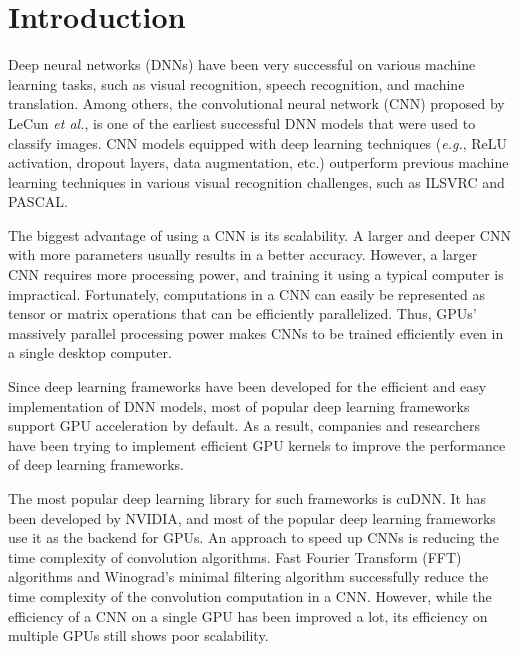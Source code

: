 \section{Introduction}

Deep neural networks (DNNs) have been very successful on various machine learning tasks, such as visual recognition\cite{krizhevsky2012imagenet,vgg,RCNN}, speech recognition\cite{speech}, and machine translation\cite{machinetranslation}. Among others, the convolutional neural network (CNN) proposed by LeCun \textit{et al.}\cite{726791}, is one of the earliest successful DNN models that were used to classify images. CNN models equipped with deep learning techniques (\textit{e.g.}, ReLU activation, dropout layers, data augmentation, etc.) outperform previous machine learning techniques in various visual recognition challenges, such as ILSVRC\cite{DBLP:journals/corr/RussakovskyDSKSMHKKBBF14} and PASCAL\cite{pascal}.


The biggest advantage of using a CNN is its scalability. A larger and deeper CNN with more parameters usually results in a better accuracy. However, a larger CNN requires more processing power, and training it using a typical computer is impractical. Fortunately, computations in a CNN can easily be represented as tensor or matrix operations that can be efficiently parallelized. Thus, GPUs' massively parallel processing power makes CNNs to be trained efficiently even in a single desktop computer.

Since deep learning frameworks have been developed for the efficient and easy implementation of DNN models, most of popular deep learning frameworks support GPU acceleration by default\cite{DBLP:journals/corr/Al-RfouAAa16,jia2014caffe,tensorflow2015-whitepaper,torch,cntk}.
As a result, companies and researchers have been trying to implement efficient GPU kernels to improve the performance of deep learning frameworks.

The most popular deep learning library for such frameworks is cuDNN\cite{cudnn}. It has been developed by NVIDIA, and most of the popular deep learning frameworks use it as the backend for GPUs. An approach to speed up CNNs is reducing the time complexity of convolution algorithms.
Fast Fourier Transform (FFT) algorithms\cite{fftconv, fbfft} and Winograd's minimal filtering algorithm\cite{winograd} successfully reduce the time complexity of the convolution computation in a CNN.
However, while the efficiency of a CNN on a single GPU has been improved a lot, its efficiency on multiple GPUs still shows poor scalability\cite{DBLP:journals/corr/YadanATR13}.

